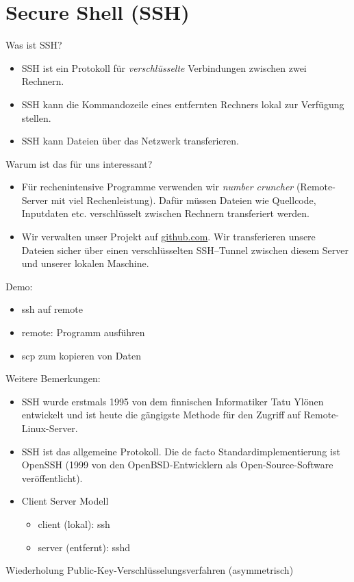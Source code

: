 \section{Secure Shell (SSH)}
Was ist SSH?
\begin{itemize}
	\item SSH ist ein Protokoll für \textit{verschlüsselte} Verbindungen zwischen zwei Rechnern.
	\item SSH kann die Kommandozeile eines entfernten Rechners lokal zur Verfügung stellen.
	\item SSH kann Dateien über das Netzwerk transferieren.
\end{itemize}
Warum ist das für uns interessant?
\begin{itemize}
	\item Für rechenintensive Programme verwenden wir \textit{number cruncher} (Remote-Server mit viel Rechenleistung). Dafür müssen Dateien wie Quellcode, Inputdaten etc. verschlüsselt zwischen Rechnern transferiert werden.
	\item Wir verwalten unser Projekt auf \url{github.com}. Wir transferieren unsere Dateien sicher über einen verschlüsselten SSH--Tunnel zwischen diesem Server und unserer lokalen Maschine.
\end{itemize}
Demo:
\begin{itemize}
	\item  ssh auf remote
	\item remote: Programm ausführen
	\item scp zum kopieren von Daten
\end{itemize}
Weitere Bemerkungen:
\begin{itemize}
	\item SSH wurde erstmals 1995 von dem finnischen Informatiker Tatu Ylönen entwickelt und ist heute die gängigste Methode für den Zugriff auf Remote-Linux-Server.
	\item SSH ist das allgemeine Protokoll. Die de facto Standardimplementierung ist OpenSSH (1999 von den OpenBSD-Entwicklern als Open-Source-Software veröffentlicht).
	\item Client Server Modell
	      \begin{itemize}
		      \item client (lokal): ssh
		      \item server (entfernt): sshd
	      \end{itemize}
\end{itemize}
Wiederholung Public-Key-Verschlüsselungsverfahren (asymmetrisch)
